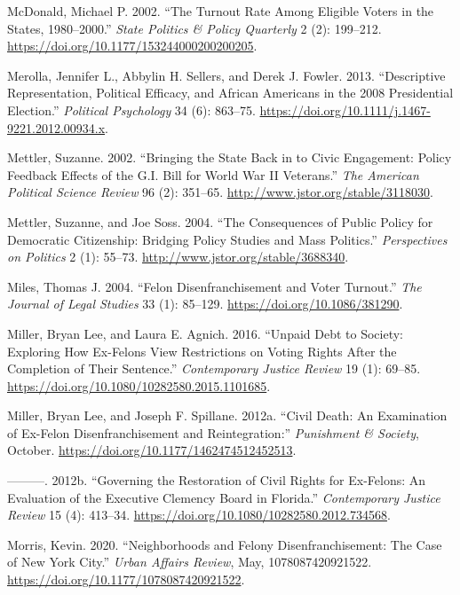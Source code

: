 \documentclass[
  12pt,
]{article}
\newlength{\cslhangindent}
\newenvironment{cslreferences}%
  {\setlength{\parindent}{0pt}%
  \everypar{\setlength{\hangindent}{\cslhangindent}}\ignorespaces}%
  {\par}
\begin{document}
\begin{cslreferences}
\leavevmode\hypertarget{ref-McDonald2002}{}%
McDonald, Michael P. 2002. ``The Turnout Rate Among Eligible Voters in the States, 1980--2000.'' \emph{State Politics \& Policy Quarterly} 2 (2): 199--212. \url{https://doi.org/10.1177/153244000200200205}.

\leavevmode\hypertarget{ref-Merolla2013}{}%
Merolla, Jennifer L., Abbylin H. Sellers, and Derek J. Fowler. 2013. ``Descriptive Representation, Political Efficacy, and African Americans in the 2008 Presidential Election.'' \emph{Political Psychology} 34 (6): 863--75. \url{https://doi.org/10.1111/j.1467-9221.2012.00934.x}.

\leavevmode\hypertarget{ref-Mettler2002}{}%
Mettler, Suzanne. 2002. ``Bringing the State Back in to Civic Engagement: Policy Feedback Effects of the G.I. Bill for World War II Veterans.'' \emph{The American Political Science Review} 96 (2): 351--65. \url{http://www.jstor.org/stable/3118030}.

\leavevmode\hypertarget{ref-Mettler2004}{}%
Mettler, Suzanne, and Joe Soss. 2004. ``The Consequences of Public Policy for Democratic Citizenship: Bridging Policy Studies and Mass Politics.'' \emph{Perspectives on Politics} 2 (1): 55--73. \url{http://www.jstor.org/stable/3688340}.

\leavevmode\hypertarget{ref-Miles2004}{}%
Miles, Thomas J. 2004. ``Felon Disenfranchisement and Voter Turnout.'' \emph{The Journal of Legal Studies} 33 (1): 85--129. \url{https://doi.org/10.1086/381290}.

\leavevmode\hypertarget{ref-Miller2016}{}%
Miller, Bryan Lee, and Laura E. Agnich. 2016. ``Unpaid Debt to Society: Exploring How Ex-Felons View Restrictions on Voting Rights After the Completion of Their Sentence.'' \emph{Contemporary Justice Review} 19 (1): 69--85. \url{https://doi.org/10.1080/10282580.2015.1101685}.

\leavevmode\hypertarget{ref-Miller2012}{}%
Miller, Bryan Lee, and Joseph F. Spillane. 2012a. ``Civil Death: An Examination of Ex-Felon Disenfranchisement and Reintegration:'' \emph{Punishment \& Society}, October. \url{https://doi.org/10.1177/1462474512452513}.

\leavevmode\hypertarget{ref-Miller2012a}{}%
---------. 2012b. ``Governing the Restoration of Civil Rights for Ex-Felons: An Evaluation of the Executive Clemency Board in Florida.'' \emph{Contemporary Justice Review} 15 (4): 413--34. \url{https://doi.org/10.1080/10282580.2012.734568}.

\leavevmode\hypertarget{ref-Morris2020}{}%
Morris, Kevin. 2020. ``Neighborhoods and Felony Disenfranchisement: The Case of New York City.'' \emph{Urban Affairs Review}, May, 1078087420921522. \url{https://doi.org/10.1177/1078087420921522}.


\end{cslreferences}
\end{document}
